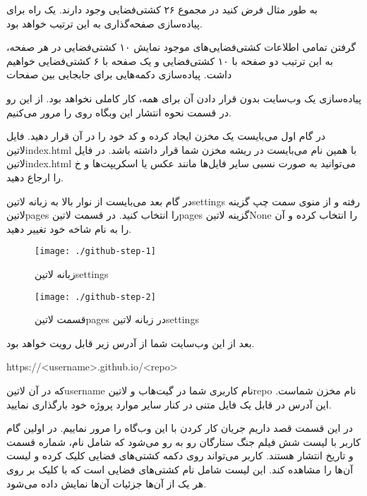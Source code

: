 \documentclass[../main.tex]{subfiles}
\begin{document}
به طور مثال فرض کنید در مجموع ۲۶ کشتی‌فضایی وجود دارند. یک راه برای پیاده‌سازی صفحه‌گذاری به این ترتیب خواهد بود.

 گرفتن تمامی اطلاعات کشتی‌فضایی‌های موجود
 نمایش ۱۰ کشتی‌فضایی در هر صفحه، به این ترتیب دو صفحه با ۱۰ کشتی‌فضایی و یک صفحه با ۶ کشتی‌فضایی خواهیم داشت.
 پیاده‌سازی دکمه‌هایی برای جابجایی بین صفحات

پیاده‌سازی یک وب‌سایت بدون قرار دادن آن برای همه، کار کاملی نخواهد بود. از این رو در قسمت نحوه انتشار این وبگاه روی  را مرور می‌کنیم.

در گام اول می‌بایست یک مخزن ایجاد کرده و کد خود را در آن قرار دهید. فایل ‌لاتین{index.html} با همین نام می‌بایست در ریشه مخزن شما قرار داشته باشد.
در فایل ‌لاتین{index.html} می‌توانید به صورت نسبی سایر فایل‌ها مانند عکس یا اسکریپت‌ها و ‌خ را ارجاع دهید.

در گام بعد می‌بایست از نوار بالا به زبانه ‌لاتین{settings} رفته و از منوی سمت چپ گزینه ‌لاتین{pages} را انتخاب کنید.
در قسمت ‌لاتین{pages} گزینه ‌لاتین{None} را انتخاب کرده و آن را به نام شاخه خود تغییر دهید.

\begin{figure}[h]
  \centering
  \texttt{[image: ./github-step-1]}
  \caption{زبانه ‌لاتین{settings}}
\end{figure}

\begin{figure}[h]
  \centering
  \texttt{[image: ./github-step-2]}
  \caption{قسمت ‌لاتین{pages} در زبانه ‌لاتین{settings}}
\end{figure}

بعد از این وب‌سایت شما از آدرس زیر قابل رویت خواهد بود.

\begin{latin}\begin{center}
https://<username>.github.io/<repo>
\end{center}\end{latin}

که در آن ‌لاتین{username} نام کاربری شما در گیت‌هاب و ‌لاتین{repo} نام مخزن شماست. این آدرس در قابل یک فایل متنی در کنار سایر موارد پروژه خود بارگذاری نمایید.


در این قسمت قصد داریم جریان کار کردن با این وب‌گاه را مرور نماییم.
در اولین گام کاربر با لیست شش فیلم جنگ ستارگان رو به رو می‌شود که شامل
نام، شماره قسمت و تاریخ انتشار هستند.
کاربر می‌تواند روی دکمه کشتی‌های فضایی کلیک کرده و لیست آن‌ها را مشاهده کند.
این لیست شامل نام کشتی‌های فضایی است که با کلیک بر روی هر یک از آن‌ها
جزئیات آن‌ها نمایش داده می‌شود.
\end{document}
